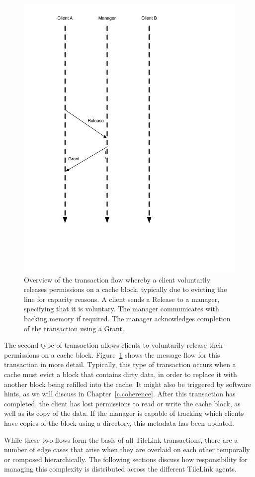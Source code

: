 \begin{figure}[t!]
\centering
\includegraphics[width=0.5\columnwidth]{tilelink/figures/volwb.pdf}
\caption[Transaction flow to Release permissions on a cache block.]{
Overview of the transaction flow whereby a client voluntarily releases permissions on a cache block,
typically due to evicting the line for capacity reasons.
A client sends a Release to a manager, specifying that it is voluntary.
The manager communicates with backing memory if required.
The manager acknowledges completion of the transaction using a Grant.
}
\label{fig:volwb}
\end{figure}

The second type of transaction allows clients to voluntarily release their permissions on a cache block.
Figure~\ref{fig:volwb} shows the message flow for this transaction in more detail.
Typically, this type of transaction occurs when a cache must evict a block that contains dirty data, in order to replace it
with another block being refilled into the cache.
It might also be triggered by software hints, as we will discuss in Chapter~\ref{c.coherence}.
After this transaction has completed, the client has lost permissions to read or write the cache block, as well as its copy of the data.
If the manager is capable of tracking which clients have copies of the block using a directory, this metadata has been updated.

While these two flows form the basis of all TileLink transactions, there are a number of edge cases that arise when
they are overlaid on each other temporally or composed hierarchically.
The following sections discuss how responsibility for managing this complexity is distributed across the different TileLink agents.

